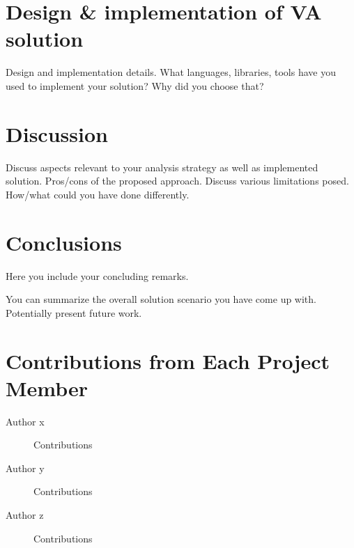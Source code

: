 \documentclass[journal]{vgtc}                %
\begin{document}
\section{Design \& implementation of VA solution}
Design and implementation details. 
What languages, libraries, tools have you used to implement your solution? Why did you choose that?

\section{Discussion}
Discuss aspects relevant to your analysis strategy as well as implemented solution.
Pros/cons of the proposed approach.
Discuss various limitations posed. 
How/what could you have done differently.

\section{Conclusions}
Here you include your concluding remarks. 

You can summarize the overall solution scenario you have come up with. 
Potentially present future work.






\section*{Contributions from Each Project Member}\label{cont}

\begin{description}
\item[Author x] {Contributions}
\item[Author y] {Contributions}
\item[Author z] {Contributions}

\end{description}
\end{document}
